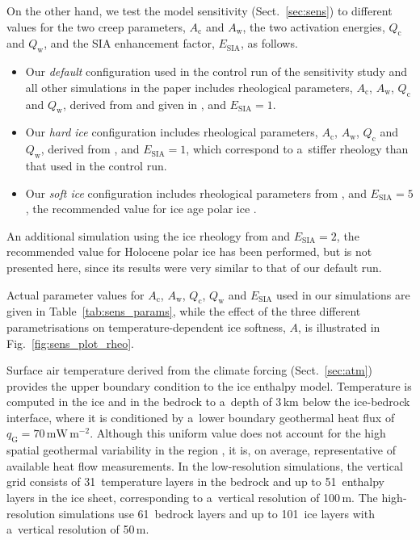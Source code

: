 \documentclass{article}
\newcommand{\unit}[1]{\ensuremath{\mathrm{#1}}}
\begin{document}
      On the other hand, we test the model sensitivity
      (Sect.~\ref{sec:sens}) to different values for the two creep
      parameters, $A_{\mathrm{c}}$ and $A_{\mathrm{w}}$, the two activation
      energies, $Q_{\mathrm{c}}$ and $Q_{\mathrm{w}}$, and the SIA
      enhancement factor, $E_{\text{SIA}}$, as follows.
%
\begin{itemize}
  \item Our \emph{default} configuration used in the control run of the
    sensitivity study and all other simulations in the paper includes
    rheological parameters,
    $A_{\mathrm{c}}$, $A_{\mathrm{w}}$, $Q_{\mathrm{c}}$ and
    $Q_{\mathrm{w}}$, derived from \citet{Paterson.Budd.1982} and given in
    \citet[Eqn.~5]{Bueler.Brown.2009}, and $E_{\text{SIA}}=1$.
  \item Our \emph{hard ice} configuration includes rheological parameters,
    $A_{\mathrm{c}}$, $A_{\mathrm{w}}$, $Q_{\mathrm{c}}$ and
    $Q_{\mathrm{w}}$, derived from \citet[p.~72 and
    76]{Cuffey.Paterson.2010}, and $E_{\text{SIA}}=1$, which correspond to
    a~stiffer rheology than that used in the control run.
  \item Our \emph{soft ice} configuration includes rheological parameters
    from \citet{Cuffey.Paterson.2010}, and $E_{\text{SIA}}=5$, the
    recommended value for ice age polar ice
    \citep[p.~77]{Cuffey.Paterson.2010}.
\end{itemize}
%
      An additional simulation using the ice rheology from
      \citet{Cuffey.Paterson.2010} and $E_{\text{SIA}}=2$, the recommended
      value for Holocene polar ice \citep[p.~77]{Cuffey.Paterson.2010} has
      been performed, but is not presented here, since its results were very
      similar to that of our default run.

      Actual parameter values for $A_{\mathrm{c}}$, $A_{\mathrm{w}}$,
      $Q_{\mathrm{c}}$, $Q_{\mathrm{w}}$ and $E_{\text{SIA}}$ used in our
      simulations are given in Table~\ref{tab:sens_params}, while the effect
      of the three different parametrisations on temperature-dependent ice
      softness, $A$, is illustrated in Fig.~\ref{fig:sens_plot_rheo}.

      Surface air
      temperature derived from the climate forcing (Sect.~\ref{sec:atm})
      provides the upper boundary condition to the ice enthalpy
      model. Temperature is computed in the ice and in the bedrock to
      a~depth of 3\,\unit{km} below the ice-bedrock interface, where it is
      conditioned by a~lower boundary geothermal heat flux of
      $q_{\mathrm{G}}=70$\,\unit{mW\,m^{-2}}. Although this uniform value
      does
      not account for the high spatial geothermal variability in the region
      \citep{Blackwell.Richards.2004}, it is, on average, representative of
      available heat flow measurements. In the low-resolution simulations,
      the vertical grid consists of 31~temperature layers in the bedrock and
      up to 51~enthalpy layers in the ice sheet, corresponding to a~vertical
      resolution of 100\,\unit{m}. The high-resolution simulations use
      61~bedrock layers and up to 101~ice layers with a~vertical resolution
      of 50\,\unit{m}.
\end{document}
